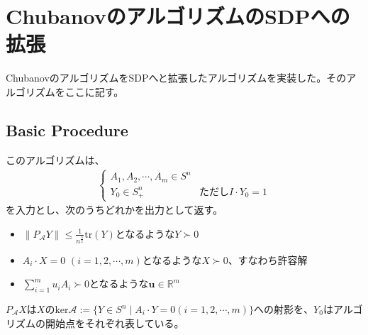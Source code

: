 \section{ChubanovのアルゴリズムのSDPへの拡張}
ChubanovのアルゴリズムをSDPへと拡張したアルゴリズムを実装した。そのアルゴリズムをここに記す。

\subsection{Basic Procedure}
このアルゴリズムは、
\begin{align*}
  \left\{
    \begin{array}{ll}
      A_1, A_2, \cdots, A_m \in S^n \\
      Y_0 \in S_+^n                 & \text{ただし}I \cdot Y_0 = 1
    \end{array}
  \right.
\end{align*}
を入力とし、次のうちどれかを出力として返す。
\begin{itemize}
  \item $\displaystyle{\|P_\mathcal{A} Y\| \leq \frac{1}{n^{\frac{3}{2}}} \mathrm{tr}(Y)}$となるような$Y \succ 0$
  \item $A_i \cdot X = 0 \,\, (i = 1, 2, \cdots, m)$となるような$X \succ 0$、すなわち許容解
  \item $\displaystyle{\sum_{i = 1}^m u_i A_i \succ 0}$となるような$\mathbf{u} \in \mathbb{R}^m$
\end{itemize}
$P_\mathcal{A} X$は$X$の$\mathrm{ker}\mathcal{A} := \{Y \in S^n \mid A_i \cdot Y = 0 (i = 1, 2, \cdots, m)\}$への射影を、$Y_0$はアルゴリズムの開始点をそれぞれ表している。

